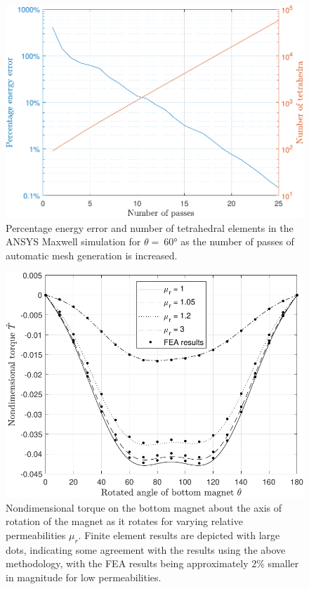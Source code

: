 \begin{figure}
    \centering
    \includegraphics[width=0.8\linewidth]{p4/p4FIG7}
    \caption{Percentage energy error and number of tetrahedral elements in the ANSYS Maxwell simulation for \(\theta =\ \)\ang{60} as the number of passes of automatic mesh generation is increased.}
    \label{fig:p4rotateConvergence}
\end{figure}
\begin{figure}
	\centering
	\includegraphics[width=0.8\linewidth]{p4/p4FIG8}
	\caption{Nondimensional torque on the bottom magnet about the axis of rotation of the magnet as it rotates for varying relative permeabilities \(\mu_r\). Finite element results are depicted with large dots, indicating some agreement with the results using the above methodology, with the FEA results being approximately 2\% smaller in magnitude for low permeabilities.}
	\label{fig:p4cubeMagnetRotatedTorquex}
\end{figure}
